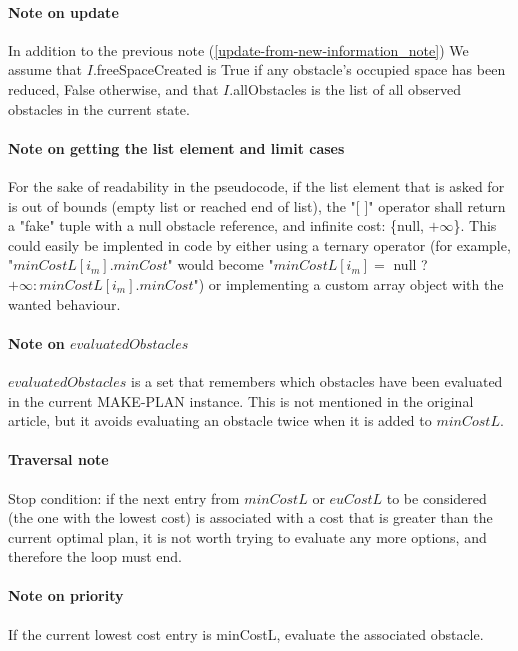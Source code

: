 \paragraph{Note on update}\label{second_update-from-new-information_note} In addition to the previous note (\ref{update-from-new-information_note}) We assume that $I$.freeSpaceCreated is True if any obstacle's occupied space has been reduced, False otherwise, and that $I$.allObstacles is the list of all observed obstacles in the current state.

\paragraph{Note on getting the list element and limit cases}\label{get_list_element_note} For the sake of readability in the pseudocode, if the list element that is asked for is out of bounds (empty list or reached end of list), the "[ ]" operator shall return a "fake" tuple with a null obstacle reference, and infinite cost: \{null, $+\infty$\}. This could easily be implented in code by either using a ternary operator (for example, "$minCostL[i_{m}].minCost$" would become "$minCostL[i_{m}] =$ null ? $+\infty: minCostL[i_{m}].minCost$") or implementing a custom array object with the wanted behaviour.

\paragraph{Note on $evaluatedObstacles$}\label{evaluated_obstacles_note} $evaluatedObstacles$ is a set that remembers which obstacles have been evaluated in the current MAKE-PLAN instance. This is not mentioned in the original article, but it avoids evaluating an obstacle twice when it is added to $minCostL$.

\paragraph{Traversal note}\label{list_traversal_note} Stop condition: if the next entry from $minCostL$ or $euCostL$ to be considered (the one with the lowest cost) is associated with a cost that is greater than the current optimal plan, it is not worth trying to evaluate any more options, and therefore the loop must end.

\paragraph{Note on priority}\label{minCostL_priority_note} If the current lowest cost entry is minCostL, evaluate the associated obstacle.

